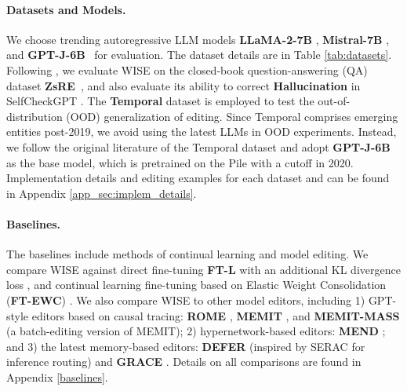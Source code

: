 \documentclass{article}
\begin{document}
\paragraph{Datasets and Models.} 
We choose trending autoregressive LLM models \textbf{LLaMA-2-7B} \cite{llama-2},  \textbf{Mistral-7B} \cite{mistral}, and \textbf{GPT-J-6B}~\cite{gpt-1,gpt-j} for evaluation. The dataset details are in Table \ref{tab:datasets}. Following \cite{grace}, we evaluate WISE on the closed-book question-answering (QA) dataset \textbf{ZsRE}~\cite{zsre}, and also evaluate its ability to correct \textbf{Hallucination} in SelfCheckGPT \cite{selfcheckgpt}.
The \textbf{Temporal} dataset \cite{canonical_examples} is employed to test the out-of-distribution (OOD) generalization of editing. 
Since Temporal comprises emerging entities post-2019, we avoid using the latest LLMs in OOD experiments.
Instead, we follow the original literature of the Temporal dataset \cite{canonical_examples} and adopt \textbf{GPT-J-6B} as the base model, which is pretrained on the Pile \cite{pile} with a cutoff in 2020.
Implementation details and editing examples for each dataset and can be found in Appendix \ref{app_sec:implem_details}.

\paragraph{Baselines.} 
The baselines include methods of continual learning and model editing.
We compare WISE against direct fine-tuning \textbf{FT-L} with an additional KL divergence loss \cite{rome}, and continual learning fine-tuning based on Elastic Weight Consolidation (\textbf{FT-EWC}) \cite{ewc}.
We also compare WISE to other model editors, including 1) GPT-style editors based on causal tracing: \textbf{ROME} \cite{rome}, \textbf{MEMIT} \cite{memit}, and \textbf{MEMIT-MASS} (a batch-editing version of MEMIT); 2) hypernetwork-based editors: \textbf{MEND} \cite{mend};
and 3) the latest memory-based editors: \textbf{DEFER} (inspired by SERAC \cite{serac} for inference routing) and \textbf{GRACE} \cite{grace}. Details on all comparisons are found in Appendix \ref{baselines}.
\end{document}
